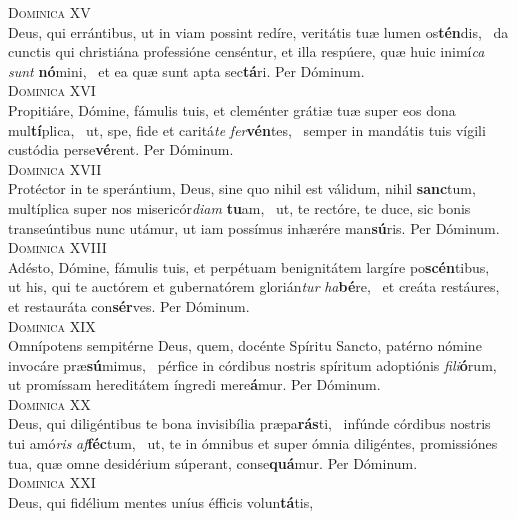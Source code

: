 \begin{translatioMulticol}{2}
{\color{red}\textsc{Dominica XV}}\\
Deus, qui errántibus, ut in viam possint redíre, veritátis tuæ lumen os\textbf{tén}dis,~\gredagger{}
da cunctis qui christiána professióne censéntur, et illa respúere, quæ huic inimí\textit{ca} \textit{sunt} \textbf{nó}mini,~\grestar{}
et ea quæ sunt apta sec\textbf{tá}ri. Per Dóminum.\\
{\color{red}\textsc{Dominica XVI}}\\
Propitiáre, Dómine, fámulis tuis, et cleménter grátiæ tuæ super eos dona mul\textbf{tí}plica,~\gredagger{}
ut, spe, fide et caritá\textit{te} \textit{fer}\textbf{vén}tes,~\grestar{}
semper in mandátis tuis vígili custódia perse\textbf{vé}rent. Per Dóminum.\\
{\color{red}\textsc{Dominica XVII}}\\
Protéctor in te sperántium, Deus, sine quo nihil est válidum, nihil \textbf{sanc}tum,~\gredagger{}
multíplica super nos misericór\textit{di}\textit{am} \textbf{tu}am,~\grestar{}
ut, te rectóre, te duce, sic bonis transeúntibus nunc utámur, ut iam possímus inhærére man\textbf{sú}ris. Per Dóminum.\\
{\color{red}\textsc{Dominica XVIII}}\\
Adésto, Dómine, fámulis tuis, et perpétuam benignitátem largíre po\textbf{scén}tibus,~\gredagger{}
ut his, qui te auctórem et gubernatórem glorián\textit{tur} \textit{ha}\textbf{bé}re,~\grestar{}
et creáta restáures, et restauráta con\textbf{sér}ves. Per Dóminum.\\
{\color{red}\textsc{Dominica XIX}}\\
Omnípotens sempitérne Deus, quem, docénte Spíritu Sancto, patérno nómine invocáre præ\textbf{sú}mimus,~\gredagger{}
pérfice in córdibus nostris spíritum adoptiónis \textit{fi}\textit{li}\textbf{ó}rum,~\grestar{}
ut promíssam hereditátem íngredi mere\textbf{á}mur. Per Dóminum.\\
{\color{red}\textsc{Dominica XX}}\\
Deus, qui diligéntibus te bona invisibília præpa\textbf{rás}ti,~\gredagger{}
infúnde córdibus nostris tui amó\textit{ris} \textit{af}\textbf{féc}tum,~\grestar{}
ut, te in ómnibus et super ómnia diligéntes, promissiónes tua, quæ omne desidérium súperant, conse\textbf{quá}mur. Per Dóminum.\\
{\color{red}\textsc{Dominica XXI}}\\
Deus, qui fidélium mentes uníus éfficis volun\textbf{tá}tis,~\gredagger{}

\end{translatioMulticol}
